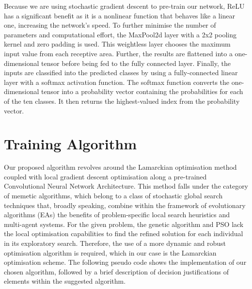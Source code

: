 \documentclass[conference]{IEEEtran}
\begin{document}
Because we are using stochastic gradient descent to pre-train our network, ReLU has a significant benefit as it is a nonlinear function that behaves like a linear one, increasing the network's speed. To further minimise the number of parameters and computational effort, the MaxPool2d layer with a 2x2 pooling kernel and zero padding is used. This weightless layer chooses the maximum input value from each receptive area. Further, the results are flattened into a one-dimensional tensor before being fed to the fully connected layer. Finally, the inputs are classified into the predicted classes by using a fully-connected linear layer with a softmax activation function. The softmax function converts the one-dimensional tensor into a probability vector containing the probabilities for each of the ten classes. It then returns the highest-valued index from the probability vector.



\section{Training Algorithm}
Our proposed algorithm revolves around the Lamarckian optimisation method coupled with local gradient descent optimisation along a pre-trained Convolutional Neural Network Architecture. This method falls under the category of memetic algorithms, which belong to a class of stochastic global search techniques that, broadly speaking, combine within the framework of evolutionary algorithms (EAs) the benefits of problem-specific local search heuristics and multi-agent systems\cite{Krasnogor_2012}. For the given problem, the genetic algorithm and PSO lack the local optimisation capabilities to find the refined solution for each individual in its exploratory search. Therefore, the use of a more dynamic and robust optimisation algorithm is required, which in our case is the  Lamarckian optimisation scheme. The following pseudo code shows the implementation of our chosen algorithm, followed by a brief description of decision justifications of elements within the suggested algorithm.
\end{document}
